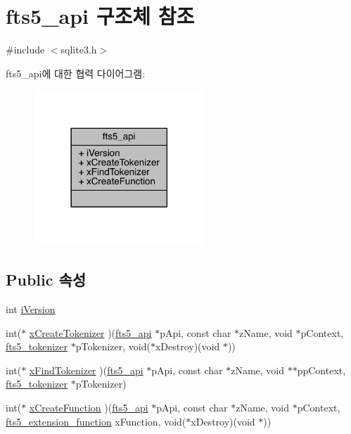 \hypertarget{structfts5__api}{}\section{fts5\+\_\+api 구조체 참조}
\label{structfts5__api}


{\ttfamily \#include $<$sqlite3.\+h$>$}



fts5\+\_\+api에 대한 협력 다이어그램\+:
\nopagebreak
\begin{figure}[H]
\begin{center}
\leavevmode
\includegraphics[width=182pt]{structfts5__api__coll__graph}
\end{center}
\end{figure}
\subsection*{Public 속성}
\begin{DoxyCompactItemize}
\item 
int \hyperlink{structfts5__api_a3c338289abb33e1805da870172956a7c}{i\+Version}
\item 
int($\ast$ \hyperlink{structfts5__api_a7fe3663f85eab512d5c461e1674da129}{x\+Create\+Tokenizer} )(\hyperlink{structfts5__api}{fts5\+\_\+api} $\ast$p\+Api, const char $\ast$z\+Name, void $\ast$p\+Context, \hyperlink{structfts5__tokenizer}{fts5\+\_\+tokenizer} $\ast$p\+Tokenizer, void($\ast$x\+Destroy)(void $\ast$))
\item 
int($\ast$ \hyperlink{structfts5__api_a20a23794695fa61e2892ad1243b16b67}{x\+Find\+Tokenizer} )(\hyperlink{structfts5__api}{fts5\+\_\+api} $\ast$p\+Api, const char $\ast$z\+Name, void $\ast$$\ast$pp\+Context, \hyperlink{structfts5__tokenizer}{fts5\+\_\+tokenizer} $\ast$p\+Tokenizer)
\item 
int($\ast$ \hyperlink{structfts5__api_acf1a0612be3b91b908f38ecbc6735d17}{x\+Create\+Function} )(\hyperlink{structfts5__api}{fts5\+\_\+api} $\ast$p\+Api, const char $\ast$z\+Name, void $\ast$p\+Context, \hyperlink{sqlite3_8h_a8a1df7b5a066b194f490be5936e85c17}{fts5\+\_\+extension\+\_\+function} x\+Function, void($\ast$x\+Destroy)(void $\ast$))
\end{DoxyCompactItemize}


